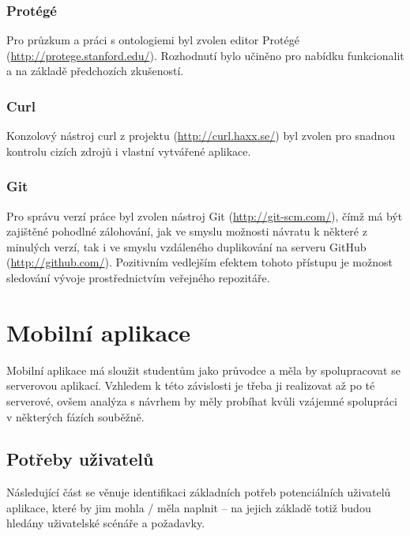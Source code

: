 \subsubsection{Protégé}
Pro průzkum a práci s ontologiemi byl zvolen editor Protégé (\url{http://protege.stanford.edu/}). Rozhodnutí bylo učiněno pro nabídku funkcionalit a na základě předchozích zkušeností.

\subsubsection{Curl}
Konzolový nástroj curl z projektu  (\url{http://curl.haxx.se/}) byl zvolen pro snadnou kontrolu cizích zdrojů i vlastní vytvářené aplikace.

\subsubsection{Git}
\label{sec:server:tools:git}
Pro správu verzí práce byl zvolen nástroj Git (\url{http://git-scm.com/}), čímž má být zajištěné pohodlné zálohování, jak ve smyslu možnosti návratu k některé z minulých verzí, tak i ve smyslu vzdáleného duplikování na serveru GitHub (\url{http://github.com/}). Pozitivním vedlejším efektem tohoto přístupu je možnost sledování vývoje prostřednictvím veřejného repozitáře.


\section{Mobilní aplikace}
Mobilní aplikace má sloužit studentům jako průvodce a měla by spolupracovat se serverovou aplikací. Vzhledem k této závislosti je třeba ji realizovat až po té serverové, ovšem analýza s návrhem by měly probíhat kvůli vzájemné spolupráci v některých fázích souběžně.

\subsection{Potřeby uživatelů}
Následující část se věnuje identifikaci základních potřeb potenciálních uživatelů aplikace, které by jim mohla / měla naplnit -- na jejich základě totiž budou hledány uživatelské scénáře a požadavky.

